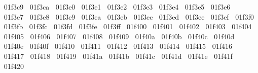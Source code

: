 {  ^^^^^^01f3c9%
  ^^^^^^01f3ca%
  ^^^^^^01f3e0%
  ^^^^^^01f3e1%
  ^^^^^^01f3e2%
  ^^^^^^01f3e3%
  ^^^^^^01f3e4%
  ^^^^^^01f3e5%
  ^^^^^^01f3e6%
  ^^^^^^01f3e7%
  ^^^^^^01f3e8%
  ^^^^^^01f3e9%
  ^^^^^^01f3ea%
  ^^^^^^01f3eb%
  ^^^^^^01f3ec%
  ^^^^^^01f3ed%
  ^^^^^^01f3ee%
  ^^^^^^01f3ef%
  ^^^^^^01f3f0%
  ^^^^^^01f3fb%
  ^^^^^^01f3fc%
  ^^^^^^01f3fd%
  ^^^^^^01f3fe%
  ^^^^^^01f3ff%
  ^^^^^^01f400%
  ^^^^^^01f401%
  ^^^^^^01f402%
  ^^^^^^01f403%
  ^^^^^^01f404%
  ^^^^^^01f405%
  ^^^^^^01f406%
  ^^^^^^01f407%
  ^^^^^^01f408%
  ^^^^^^01f409%
  ^^^^^^01f40a%
  ^^^^^^01f40b%
  ^^^^^^01f40c%
  ^^^^^^01f40d%
  ^^^^^^01f40e%
  ^^^^^^01f40f%
  ^^^^^^01f410%
  ^^^^^^01f411%
  ^^^^^^01f412%
  ^^^^^^01f413%
  ^^^^^^01f414%
  ^^^^^^01f415%
  ^^^^^^01f416%
  ^^^^^^01f417%
  ^^^^^^01f418%
  ^^^^^^01f419%
  ^^^^^^01f41a%
  ^^^^^^01f41b%
  ^^^^^^01f41c%
  ^^^^^^01f41d%
  ^^^^^^01f41e%
  ^^^^^^01f41f%
  ^^^^^^01f420%
}
